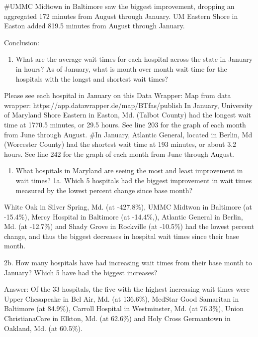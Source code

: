 \documentclass[
  letterpaper,
  DIV=11,
  numbers=noendperiod]{scrartcl}
\newenvironment{Shaded}{\begin{snugshade}}{\end{snugshade}}
\newcommand{\CommentTok}[1]{\textcolor[rgb]{0.37,0.37,0.37}{#1}}
\providecommand{\tightlist}{%
  \setlength{\itemsep}{0pt}\setlength{\parskip}{0pt}}\usepackage{longtable,booktabs,array}
\begin{document}
\begin{Shaded}
\begin{Highlighting}[]
\CommentTok{\#UMMC Midtown in Baltimore saw the biggest improvement, dropping an aggregated 172 minutes from August through January. UM Eastern Shore in Easton added 819.5 minutes from August through January.}
\end{Highlighting}
\end{Shaded}

Conclusion:

\begin{enumerate}
\def\labelenumi{\arabic{enumi}.}
\tightlist
\item
  What are the average wait times for each hospital across the state in
  January in hours? As of January, what is month over month wait time
  for the hospitals with the longst and shortest wait times?
\end{enumerate}

Please see each hospital in January on this Data Wrapper: Map from data
wrapper: https://app.datawrapper.de/map/BTfas/publish In January,
University of Maryland Shore Eastern in Easton, Md. (Talbot County) had
the longest wait time at 1770.5 minutes, or 29.5 hours. See line 203 for
the graph of each month from June through August. \#In January, Atlantic
General, located in Berlin, Md (Worcester County) had the shortest wait
time at 193 minutes, or about 3.2 hours. See line 242 for the graph of
each month from June through August.

\begin{enumerate}
\def\labelenumi{\arabic{enumi}.}
\setcounter{enumi}{1}
\tightlist
\item
  What hospitals in Maryland are seeing the most and least improvement
  in wait times? 1a. Which 5 hospitals had the biggest improvement in
  wait times measured by the lowest percent change since base month?
\end{enumerate}

White Oak in Silver Spring, Md. (at -427.8\%), UMMC Midtwon in Baltimore
(at -15.4\%), Mercy Hospital in Baltimore (at -14.4\%,), Atlantic
General in Berlin, Md. (at -12.7\%) and Shady Grove in Rockville (at
-10.5\%) had the lowest percent change, and thus the biggest decreases
in hospital wait times since their base month.

2b. How many hospitals have had increasing wait times from their base
month to January? Which 5 have had the biggest increases?

Answer: Of the 33 hospitals, the five with the highest increasing wait
times were Upper Chesapeake in Bel Air, Md. (at 136.6\%), MedStar Good
Samaritan in Baltimore (at 84.9\%), Carroll Hospital in Westminster, Md.
(at 76.3\%), Union ChristianaCare in Elkton, Md. (at 62.6\%) and Holy
Cross Germantown in Oakland, Md. (at 60.5\%).
\end{document}
